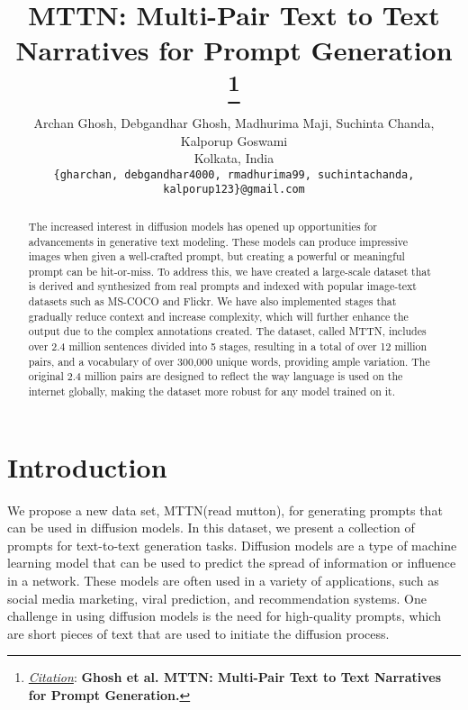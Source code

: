 \documentclass{article}
\title{MTTN: Multi-Pair Text to Text Narratives for Prompt Generation
\thanks{\textit{\underline{Citation}}: 
\textbf{Ghosh et al. MTTN: Multi-Pair Text to Text Narratives for Prompt Generation.}}}
\author{
  Archan Ghosh, Debgandhar Ghosh, Madhurima Maji, Suchinta Chanda, Kalporup Goswami \\
Kolkata, India\\
  \texttt{\{gharchan, debgandhar4000, rmadhurima99, suchintachanda, kalporup123\}@gmail.com} \\
}
\begin{document}
\maketitle


\begin{abstract}
The increased interest in diffusion models has opened up opportunities for advancements in generative text modeling. These models can produce impressive images when given a well-crafted prompt, but creating a powerful or meaningful prompt can be hit-or-miss. To address this, we have created a large-scale dataset that is derived and synthesized from real prompts and indexed with popular image-text datasets such as MS-COCO and Flickr. We have also implemented stages that gradually reduce context and increase complexity, which will further enhance the output due to the complex annotations created. The dataset, called MTTN, includes over 2.4 million sentences divided into 5 stages, resulting in a total of over 12 million pairs, and a vocabulary of over 300,000 unique words, providing ample variation. The original 2.4 million pairs are designed to reflect the way language is used on the internet globally, making the dataset more robust for any model trained on it.

\end{abstract}




\section{Introduction}
 We propose a new data set, MTTN(read mutton), for generating prompts that can be used in diffusion models\cite{DBLP:journals/corr/Sohl-DicksteinW15}\cite{DBLP:journals/corr/abs-2006-11239}\cite{DBLP:journals/corr/abs-1907-05600}. In this dataset, we present a collection of prompts for text-to-text generation tasks. Diffusion models\cite{DBLP:journals/corr/Sohl-DicksteinW15}\cite{DBLP:journals/corr/abs-2006-11239}\cite{DBLP:journals/corr/abs-1907-05600} are a type of machine learning model that can be used to predict the spread of information or influence in a network. These models are often used in a variety of applications, such as social media marketing, viral prediction, and recommendation systems. One challenge in using diffusion models\cite{DBLP:journals/corr/Sohl-DicksteinW15}\cite{DBLP:journals/corr/abs-2006-11239}\cite{DBLP:journals/corr/abs-1907-05600} is the need for high-quality prompts, which are short pieces of text that are used to initiate the diffusion process. 
\end{document}
